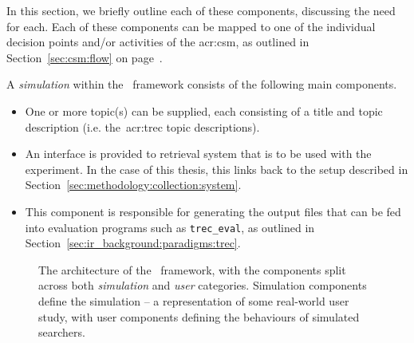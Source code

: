 In this section, we briefly outline each of these components, discussing the need for each. Each of these components can be mapped to one of the individual decision points and/or activities of the \gls{acr:csm}, as outlined in Section~\ref{sec:csm:flow} on page~\pageref{sec:csm:flow}.

A \emph{simulation} within the \simiir~framework consists of the following main components.

\begin{itemize}
    \item{ One or more topic(s) can be supplied, each consisting of a title and topic description (i.e. the~\gls{acr:trec} topic descriptions).}
    \item{ An interface is provided to retrieval system that is to be used with the experiment. In the case of this thesis, this links back to the setup described in Section~\ref{sec:methodology:collection:system}.}
    \item{ This component is responsible for generating the output files that can be fed into evaluation programs such as \texttt{trec\_eval}, as outlined in Section~\ref{sec:ir_background:paradigms:trec}.}
\end{itemize}

\begin{figure}[t!]
    \centering
    \caption[SimIIR architecture]{The architecture of the \simiir~framework, with the components split across both \emph{simulation} and \emph{user} categories. Simulation components define the simulation – a representation of some real-world user study, with user components defining the behaviours of simulated searchers.}
    \label{fig:simiir}
\end{figure}

